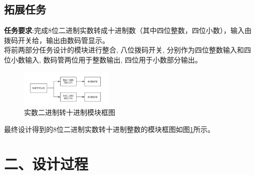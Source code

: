 \documentclass{article}
\newcommand{\fourhao}{\fontsize{14pt}{\baselineskip}\selectfont} %
\newcommand{\xiaosihao}{\fontsize{12pt}{\baselineskip}\selectfont} %
\begin{document}
\subsection*{拓展任务}
\textbf{任务要求}:完成8位二进制实数转成十进制数（其中四位整数，四位小数），输入由拨码开关给，输出由数码管显示。\\

将前两部分任务设计的模块进行整合, 八位拨码开关, 分别作为四位整数输入和四位小数输入, 数码管两位用于整数输出, 四位用于小数部分输出。\\
\begin{figure}[htbp]
    \centering
    \includegraphics[width=0.4\textwidth]{image/2024-06-28-15-30-37.png}
    \caption{实数二进制转十进制模块框图}
    \label{image_principle_1}
\end{figure}
最终设计得到的8位二进制实数转十进制整数的模块框图如图\ref{image_principle_1}所示。
\section*{\fourhao 二、设计过程}
\xiaosihao
{}
\end{document}
